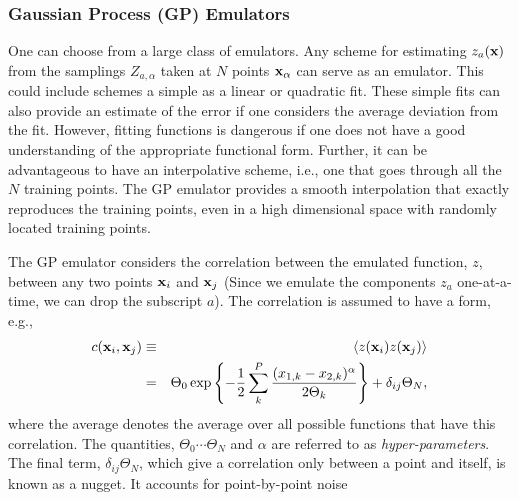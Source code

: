 \subsubsection{Gaussian Process (GP) Emulators}

One can choose from a large class of emulators. Any scheme for estimating $z_a({\bf x})$ from the samplings $Z_{a,\alpha}$ taken at $N$ points ${\bf x}_\alpha$ can serve as an emulator. This could include schemes a simple as a linear or quadratic fit. These simple fits can also provide an estimate of the error if one considers the average deviation from the fit. However, fitting functions is dangerous if one does not have a good understanding of the appropriate functional form. Further, it can be advantageous to have an interpolative scheme, i.e., one that goes through all the $N$ training points. The GP emulator provides a smooth interpolation that exactly reproduces the training points, even in a high dimensional space with randomly located training points.

The GP emulator considers the correlation between the emulated function, $z$, between any two points ${\bf x}_i$ and ${\bf x}_j$ (Since we emulate the components $z_a$ one-at-a-time, we can drop the subscript $a$). The correlation is assumed to have a form, e.g.,
\begin{eqnarray}
\label{eq:hyperform}
c({\bf x}_i,{\bf x}_j)&\equiv&\langle z({\bf x}_i)z({\bf x}_j)\rangle\\
\nonumber
&=&\Theta_0\exp\left\{-\frac{1}{2}\sum_k^P \frac{(x_{1,k}-x_{2,k})^\alpha}{2\Theta_k}\right\} +\delta_{ij}\Theta_N,
\end{eqnarray}
where the average denotes the average over all possible functions that have this correlation. The quantities, $\Theta_0\cdots\Theta_N$ and $\alpha$ are referred to as {\it hyper-parameters}. The final term, $\delta_{ij}\Theta_N$, which give a correlation only between a point and itself, is known as a nugget. It accounts for point-by-point noise

